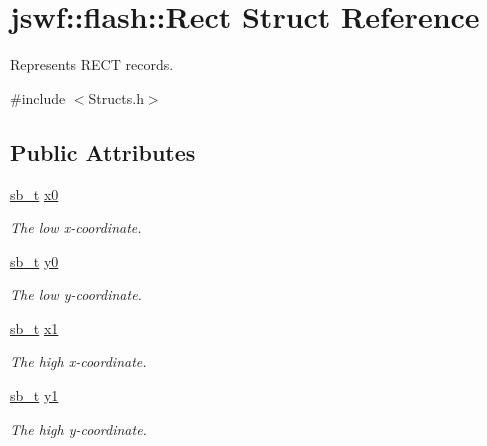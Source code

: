 \hypertarget{structjswf_1_1flash_1_1_rect}{\section{jswf\+:\+:flash\+:\+:Rect Struct Reference}
\label{structjswf_1_1flash_1_1_rect}
}


Represents {\ttfamily R\+E\+C\+T} records.  




{\ttfamily \#include $<$Structs.\+h$>$}

\subsection*{Public Attributes}
\begin{DoxyCompactItemize}
\item 
\hypertarget{structjswf_1_1flash_1_1_rect_aeaa1796316b9d0b439ef20219b0ac55e}{\hyperlink{namespacejswf_aa56b2b764590a9e19a5e66693364aceb}{sb\+\_\+t} \hyperlink{structjswf_1_1flash_1_1_rect_aeaa1796316b9d0b439ef20219b0ac55e}{x0}}\label{structjswf_1_1flash_1_1_rect_aeaa1796316b9d0b439ef20219b0ac55e}

\begin{DoxyCompactList}\small\item\em The low x-\/coordinate. \end{DoxyCompactList}\item 
\hypertarget{structjswf_1_1flash_1_1_rect_aca7a81fbc301e9a64491bee32b23e40e}{\hyperlink{namespacejswf_aa56b2b764590a9e19a5e66693364aceb}{sb\+\_\+t} \hyperlink{structjswf_1_1flash_1_1_rect_aca7a81fbc301e9a64491bee32b23e40e}{y0}}\label{structjswf_1_1flash_1_1_rect_aca7a81fbc301e9a64491bee32b23e40e}

\begin{DoxyCompactList}\small\item\em The low y-\/coordinate. \end{DoxyCompactList}\item 
\hypertarget{structjswf_1_1flash_1_1_rect_a9d293632fe94b6fa869105da30730441}{\hyperlink{namespacejswf_aa56b2b764590a9e19a5e66693364aceb}{sb\+\_\+t} \hyperlink{structjswf_1_1flash_1_1_rect_a9d293632fe94b6fa869105da30730441}{x1}}\label{structjswf_1_1flash_1_1_rect_a9d293632fe94b6fa869105da30730441}

\begin{DoxyCompactList}\small\item\em The high x-\/coordinate. \end{DoxyCompactList}\item 
\hypertarget{structjswf_1_1flash_1_1_rect_ac3ba53c2e08bd4f7333e3ef3223e269f}{\hyperlink{namespacejswf_aa56b2b764590a9e19a5e66693364aceb}{sb\+\_\+t} \hyperlink{structjswf_1_1flash_1_1_rect_ac3ba53c2e08bd4f7333e3ef3223e269f}{y1}}\label{structjswf_1_1flash_1_1_rect_ac3ba53c2e08bd4f7333e3ef3223e269f}

\begin{DoxyCompactList}\small\item\em The high y-\/coordinate. \end{DoxyCompactList}\end{DoxyCompactItemize}


